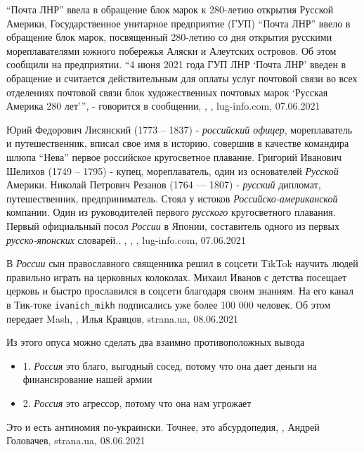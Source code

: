 \enquote{Почта ЛНР} ввела в обращение блок марок к 280-летию открытия Русской
Америки, Государственное унитарное предприятие (ГУП) \enquote{Почта ЛНР} ввело
в обращение блок марок, посвященный 280-летию со дня открытия русскими
мореплавателями южного побережья Аляски и Алеутских островов. Об этом сообщили
на предприятии.  \enquote{4 июня 2021 года ГУП ЛНР \enquote{Почта ЛНР} введен в
обращение и считается действительным для оплаты услуг почтовой связи во всех
отделениях почтовой связи блок художественных почтовых марок \enquote{Русская
Америка 280 лет}}, - говорится в сообщении,
, , lug-info.com, 07.06.2021

Юрий Федорович Лисянский (1773 – 1837) - \emph{российский офицер},
мореплаватель и путешественник, вписал свое имя в историю, совершив в качестве
командира шлюпа \enquote{Нева} первое российское кругосветное плавание.
Григорий Иванович Шелихов (1749 – 1795) - купец, мореплаватель, один из
основателей \emph{Русской} Америки.  Николай Петрович Резанов (1764 — 1807) -
\emph{русский} дипломат, путешественник, предприниматель. Стоял у истоков
\emph{Российско-американской} компании. Один из руководителей первого
\emph{русского} кругосветного плавания. Первый официальный посол \emph{России}
в Японии, составитель одного из первых \emph{русско-японских} словарей.. ,
, , lug-info.com,
07.06.2021

В \emph{России} сын православного священника решил в соцсети TikTok научить
людей правильно играть на церковных колоколах. Михаил Иванов с детства посещает
церковь и быстро прославился в соцсети благодаря своим знаниям.  На его канал в
Тик-токе \verb|ivanich_mikh| подписались уже более 100 000 человек. Об этом
передает Mash,
, Илья Кравцов, strana.ua, 08.06.2021

Из этого опуса можно сделать два взаимно противоположных вывода
\begin{itemize}
\item 1. \emph{Россия} это благо, выгодный сосед, потому что она дает деньги на финансирование нашей армии
\item 2. \emph{Россия} это агрессор, потому что она нам угрожает
\end{itemize}
Это и есть антиномия по-украински. Точнее, это абсурдопедия,
, Андрей Головачев, strana.ua, 08.06.2021

